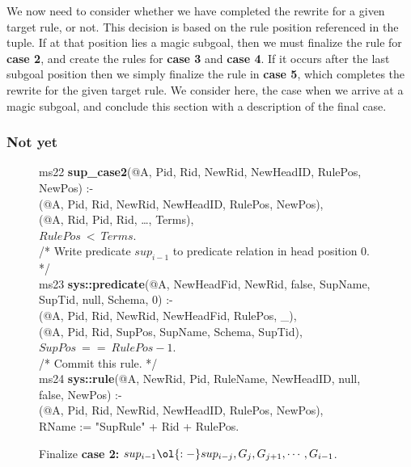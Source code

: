 We now need to consider whether we have completed the rewrite for a given
target rule, or not.  This decision is based on the rule position referenced in
the  tuple.  If at that position lies a magic subgoal, then we must
finalize the rule for {\bf case 2}, and create the rules for {\bf case 3}
and {\bf case 4}.  If it occurs after the last subgoal position then we simply
finalize the rule in {\bf case 5}, which completes the rewrite for the given
target rule.  We consider here, the case when we arrive at a magic subgoal, and
conclude this section with a description of the final case.

\subsubsection{Not yet}

\begin{figure}[!t]
\ssp
\centering
\begin{boxedminipage}{\linewidth}
ms22 {\bf sup\_case2}(@A, Pid, Rid, NewRid, NewHeadID, RulePos, NewPos) :- \\
(@A, Pid, Rid, NewRid, NewHeadID, RulePos, NewPos), \\
(@A, Rid, Pid, Rid, \ldots, Terms), \\
\datalogspace $RulePos\ <\ Terms$. \\

/* Write predicate $sup_{i-1}$ to predicate relation in head position $0$. */ \\
ms23 {\bf sys::predicate}(@A, NewHeadFid, NewRid, false, SupName, SupTid, null, Schema, 0) :- \\
(@A, Pid, Rid, NewRid, NewHeadFid, RulePos, \_), \\
(@A, Pid, Rid, SupPos, SupName, Schema, SupTid), \\
\datalogspace $SupPos\ ==\ RulePos - 1$. \\
  
/* Commit this rule. */ \\
ms24 {\bf sys::rule}(@A, NewRid, Pid, RuleName, NewHeadID, null, false, NewPos) :- \\
(@A, Pid, Rid, NewRid, NewHeadID, RulePos, NewPos), \\
\datalogspace RName := "SupRule" + Rid + RulePos.

\end{boxedminipage}
\caption{\label{ch:magic:fig:rewrite5} 
Finalize {\bf case 2:} $sup_{i-1} \ol{:-} sup_{i-j}, G_j, G_{j+1}, \cdots, G_{i-1}$.}
\end{figure}

